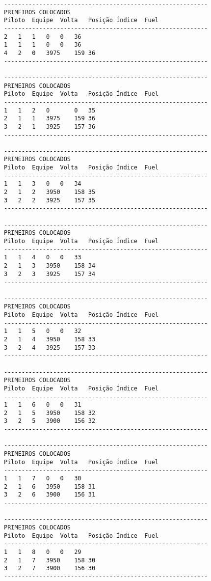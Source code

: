 \documentclass[12pt]{article}
\begin{document}
\begin{verbatim}
----------------------------------------------------------
PRIMEIROS COLOCADOS
Piloto	Equipe	Volta	Posição	Índice	Fuel
----------------------------------------------------------
2	1	1	0	0	36
1	1	1	0	0	36
4	2	0	3975	159	36
----------------------------------------------------------

----------------------------------------------------------
PRIMEIROS COLOCADOS
Piloto	Equipe	Volta	Posição	Índice	Fuel
----------------------------------------------------------
1	1	2	0       0	35
2	1	1	3975	159	36
3	2	1	3925	157	36
----------------------------------------------------------

----------------------------------------------------------
PRIMEIROS COLOCADOS
Piloto	Equipe	Volta	Posição	Índice	Fuel
----------------------------------------------------------
1	1	3	0	0	34
2	1	2	3950	158	35
3	2	2	3925	157	35
----------------------------------------------------------

----------------------------------------------------------
PRIMEIROS COLOCADOS
Piloto	Equipe	Volta	Posição	Índice	Fuel
----------------------------------------------------------
1	1	4	0	0	33
2	1	3	3950	158	34
3	2	3	3925	157	34
----------------------------------------------------------

----------------------------------------------------------
PRIMEIROS COLOCADOS
Piloto	Equipe	Volta	Posição	Índice	Fuel
----------------------------------------------------------
1	1	5	0	0	32
2	1	4	3950	158	33
3	2	4	3925	157	33
----------------------------------------------------------

----------------------------------------------------------
PRIMEIROS COLOCADOS
Piloto	Equipe	Volta	Posição	Índice	Fuel
----------------------------------------------------------
1	1	6	0	0	31
2	1	5	3950	158	32
3	2	5	3900	156	32
----------------------------------------------------------

----------------------------------------------------------
PRIMEIROS COLOCADOS
Piloto	Equipe	Volta	Posição	Índice	Fuel
----------------------------------------------------------
1	1	7	0	0	30
2	1	6	3950	158	31
3	2	6	3900	156	31
----------------------------------------------------------

----------------------------------------------------------
PRIMEIROS COLOCADOS
Piloto	Equipe	Volta	Posição	Índice	Fuel
----------------------------------------------------------
1	1	8	0	0	29
2	1	7	3950	158	30
3	2	7	3900	156	30
----------------------------------------------------------


\end{verbatim}
\end{document}
